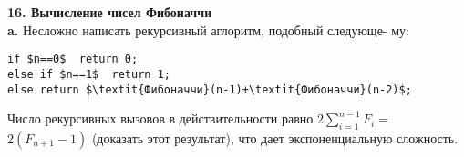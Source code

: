\noindent\textbf{16. Вычисление чисел Фибоначчи}\\

\hspace*{15pt}\textbf{a.} Несложно написать рекурсивный аглоритм, подобный следующе-\linebreak
му:
\begin{lstlisting}[xleftmargin=15pt, mathescape=true]
if $n==0$  return 0;
else if $n==1$  return 1;
else return $\textit{Фибоначчи}(n-1)+\textit{Фибоначчи}(n-2)$;
\end{lstlisting}
\hspace*{15pt}Число рекурсивных вызовов в действительности равно $2\sum_{i=1}^{n-1}F_i=$\linebreak
$2(F_{n+1}-1)$ (доказать этот результат), что дает экспоненциальную\linebreak
сложность.\newpage



